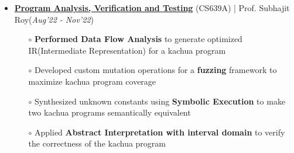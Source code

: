 \documentclass[10.8pt, a4paper]{extarticle}
\begin{document}
\begin{itemize}
  \item \href{https://github.com/vamshimorlawar/CS639A} {\textbf{Program Analysis, Verification and Testing}} (CS639A) | Prof. Subhajit Roy\hfill\hfill(\textit{Aug'22 - Nov'22})
  \begin{itemize}
    \item[$\circ$] \textbf{Performed Data Flow Analysis} to generate optimized IR(Intermediate Representation) for a kachua program \\[-0.6cm]
    \item[$\circ$] Developed custom mutation operations for a \textbf{fuzzing} framework to maximize kachua program coverage \\[-0.6cm]
    \item[$\circ$] Synthesized unknown constants using \textbf{Symbolic Execution} to make two kachua programs semantically equivalent \\[-0.6cm]
    \item[$\circ$] Applied \textbf{Abstract Interpretation with interval domain} to verify the correctness of the kachua program \\[-0.6cm]
	\end{itemize}
  \vspace{0.055cm}
\end{itemize}
\end{document}
